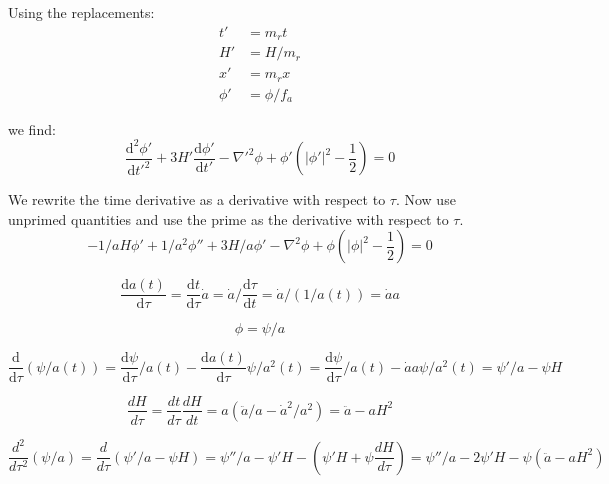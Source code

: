 \documentclass[a4paper]{article}
\begin{document}
Using the replacements:
\begin{align}
    t' &= m_r t \\
    H' &= H / m_r \\
    x' &= m_r x \\
    \phi' &= \phi / f_a
\end{align}

we find:
\begin{equation}
    \frac{\mathrm{d}^2 \phi'}{\mathrm{d} t'^2} + 3 H' \frac{\mathrm{d} \phi'}{\mathrm{d} t'} - \nabla'^2 \phi + \phi' \left( |\phi'|^2 - \frac{1}{2} \right) = 0
\end{equation}

We rewrite the time derivative as a derivative with respect to $\tau$.
Now use unprimed quantities and use the prime as the derivative with respect to $\tau$.
\begin{equation}
    - 1/a H \phi' + 1/a^2 \phi'' + 3 H / a \phi'
    - \nabla^2 \phi + \phi \left( |\phi|^2 - \frac{1}{2} \right) = 0
\end{equation}

\begin{equation}
    \frac{\mathrm{d} a(t)}{\mathrm{d} \tau} = \frac{\mathrm{d} t}{\mathrm{d} \tau} \dot{a} = \dot{a} / \frac{\mathrm{d} \tau}{\mathrm{d} t} = \dot{a} / (1 / a(t)) = \dot{a} a
\end{equation}

\begin{equation}
    \phi = \psi / a
\end{equation}

\begin{equation}
    \frac{\mathrm{d}}{\mathrm{d} \tau} ( \psi / a(t) ) = \frac{\mathrm{d} \psi}{\mathrm{d} \tau} / a(t) - \frac{\mathrm{d} a(t)}{\mathrm{d} \tau} \psi / a^2(t)
    = \frac{\mathrm{d} \psi}{\mathrm{d} \tau} / a(t) - \dot{a} a \psi / a^2(t)
    = \psi' / a - \psi H
\end{equation}

\begin{equation}
    \frac{d H}{d \tau} = \frac{d t}{d \tau} \frac{d H}{d t} = a (\ddot{a} / a - \dot{a}^2 / a^2) = \ddot{a} - a H^2
\end{equation}

\begin{equation}
    \frac{d^2}{d \tau^2} (\psi / a) = \frac{d}{d \tau} (\psi' / a - \psi H)
    = \psi'' / a - \psi' H - (\psi' H + \psi \frac{d H}{d \tau})
    = \psi'' / a - 2 \psi' H - \psi ( \ddot{a} - a H^2 )
\end{equation}
\end{document}
